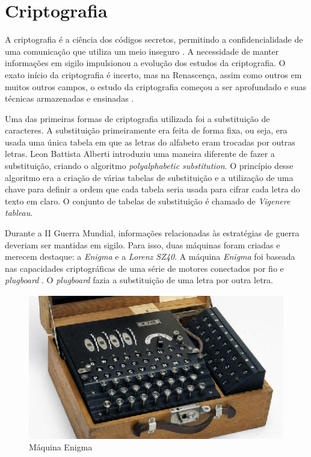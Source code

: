 \chapter{Criptografia}
\label{cryptograhy}

%
A criptografia é a ciência dos códigos secretos, permitindo a confidencialidade de uma comunicação que utiliza um meio inseguro \cite{vauldenay}. A necessidade de manter informações em sigilo impulsionou a evolução dos estudos da criptografia. O exato início da criptografia é incerto, mas na Renascença, assim como outros em muitos outros campos, o estudo da criptografia começou a ser aprofundado e suas técnicas armazenadas e ensinadas \cite{donald-davies}.

%
Uma das primeiras formas de criptografia utilizada foi a substituição de caracteres. A substituição primeiramente era feita de forma fixa, ou seja, era usada uma única tabela em que as letras do alfabeto eram trocadas por outras letras. Leon Battista Alberti introduziu uma maneira diferente de fazer a substituição, criando o algoritmo \textit{polyalphabetic substitution}. O princípio desse algoritmo era a criação de várias tabelas de substituição e a utilização de uma chave para definir a ordem que cada tabela seria usada para cifrar cada letra do texto em claro. O conjunto de tabelas de substituição é chamado de \textit{Vigenere tableau}.


%
Durante a II Guerra Mundial, informações relacionadas às estratégias de guerra deveriam ser mantidas em sigilo. Para isso, duas máquinas foram criadas e merecem destaque: a \textit{Enigma} e a \textit{Lorenz SZ40}. A máquina \textit{Enigma} foi baseada nas capacidades criptográficas de uma série de motores conectados por fio e \textit{plugboard} \cite{jennifer-wilcox}. O \textit{plugboard} fazia a substituição de uma letra por outra letra. 
\begin{figure}[h]
\centering
  \includegraphics[keepaspectratio=true,scale=2]
  {figuras/enigma.eps}
  \caption[{Máquina Enigma}]{Máquina Enigma\protect\footnotemark}
  \label{enigma-machine}
\end{figure}

